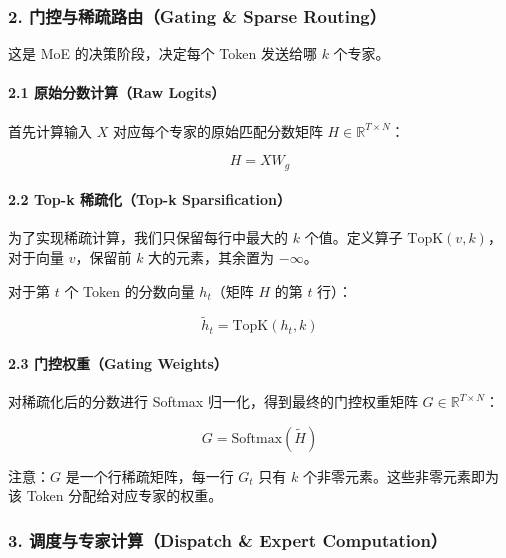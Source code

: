 \hypertarget{ux95e8ux63a7ux4e0eux7a00ux758fux8defux7531gating-sparse-routing}{%
\subsubsection{2. 门控与稀疏路由（Gating \& Sparse Routing）}\label{ux95e8ux63a7ux4e0eux7a00ux758fux8defux7531gating-sparse-routing}}

这是 MoE 的决策阶段，决定每个 Token 发送给哪 \(k\) 个专家。

\hypertarget{ux539fux59cbux5206ux6570ux8ba1ux7b97raw-logits}{%
\paragraph{2.1 原始分数计算（Raw Logits）}\label{ux539fux59cbux5206ux6570ux8ba1ux7b97raw-logits}}

首先计算输入 \(X\) 对应每个专家的原始匹配分数矩阵 \(H \in \mathbb{R}^{T \times N}\)：

\[
H = XW_g
\]

\hypertarget{top-k-ux7a00ux758fux5316top-k-sparsification}{%
\paragraph{2.2 Top-k 稀疏化（Top-k Sparsification）}\label{top-k-ux7a00ux758fux5316top-k-sparsification}}

为了实现稀疏计算，我们只保留每行中最大的 \(k\) 个值。定义算子 \(\mathrm{TopK}(v,k)\)，对于向量 \(v\)，保留前 \(k\) 大的元素，其余置为 \(-\infty\)。

对于第 \(t\) 个 Token 的分数向量 \(h_t\)（矩阵 \(H\) 的第 \(t\) 行）：

\[
\tilde{h}_t = \mathrm{TopK}(h_t,k)
\]

\hypertarget{ux95e8ux63a7ux6743ux91cdgating-weights}{%
\paragraph{2.3 门控权重（Gating Weights）}\label{ux95e8ux63a7ux6743ux91cdgating-weights}}

对稀疏化后的分数进行 Softmax 归一化，得到最终的门控权重矩阵 \(G \in \mathbb{R}^{T \times N}\)：

\[
G = \mathrm{Softmax}(\tilde{H})
\]

注意：\(G\) 是一个行稀疏矩阵，每一行 \(G_t\) 只有 \(k\) 个非零元素。这些非零元素即为该 Token 分配给对应专家的权重。

\hypertarget{ux8c03ux5ea6ux4e0eux4e13ux5bb6ux8ba1ux7b97dispatch-expert-computation}{%
\subsubsection{3. 调度与专家计算（Dispatch \& Expert Computation）}\label{ux8c03ux5ea6ux4e0eux4e13ux5bb6ux8ba1ux7b97dispatch-expert-computation}}

